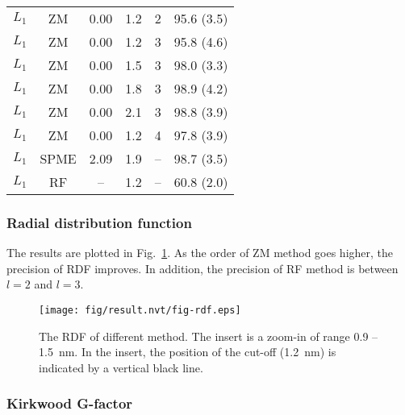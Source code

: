 \documentclass[aip,jcp,a4paper,reprint,unsortedaddress,onecolumn,fleqn]{revtex4-1}
\newcommand{\systemlb}{L_1}
\begin{document}
\begin{table}
\begin{tabular*}{0.5\textwidth}{@{\extracolsep{\fill}}cccc rr}
    $\systemlb$  &       ZM          &       0.00    &       1.2     &       2       &       95.6 (3.5)\\ 
    $\systemlb$  &       ZM          &       0.00    &       1.2     &       3       &       95.8 (4.6)\\ 
    $\systemlb$  &       ZM          &       0.00    &       1.5     &       3       &       98.0 (3.3)\\ 
    $\systemlb$  &       ZM          &       0.00    &       1.8     &       3       &       98.9 (4.2)\\ 
    $\systemlb$  &       ZM          &       0.00    &       2.1     &       3       &       98.8 (3.9)\\ 
    $\systemlb$  &       ZM          &       0.00    &       1.2     &       4       &       97.8 (3.9)\\
   $\systemlb$   & SPME          & 2.09  & 1.9   &       --      &       98.7 (3.5) \\
    $\systemlb$  & RF             & --  & 1.2 & -- & 60.8   (2.0) \\
    \hline\hline
  \end{tabular*}
  \label{tab:tmp2}
\end{table}



\subsubsection{Radial distribution function}
The results are plotted in Fig.~\ref{fig:rdf}. As the order of ZM method goes higher, the precision of RDF improves. In addition, the precision of RF method is between $l=2$ and $l=3$.
\begin{figure}
  \centering
  \texttt{[image: fig/result.nvt/fig-rdf.eps]}  
  \caption{The RDF of different method. The insert is a zoom-in of range 0.9 -- 1.5~nm. In the insert, the position of the cut-off (1.2~nm) is indicated by a vertical black line.}
  \label{fig:rdf}
\end{figure}


\subsubsection{Kirkwood G-factor}
\end{document}
